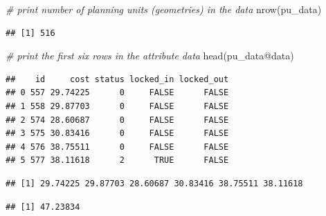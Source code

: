 \documentclass[
  12pt,
]{book}
\newenvironment{Shaded}{\begin{snugshade}}{\end{snugshade}}
\newcommand{\CommentTok}[1]{\textcolor[rgb]{0.56,0.35,0.01}{\textit{#1}}}
\newcommand{\FunctionTok}[1]{\textcolor[rgb]{0.00,0.00,0.00}{#1}}
\newcommand{\NormalTok}[1]{#1}
\newcommand{\SpecialCharTok}[1]{\textcolor[rgb]{0.00,0.00,0.00}{#1}}
\begin{document}
\begin{Shaded}
\begin{Highlighting}[]
\CommentTok{\# print number of planning units (geometries) in the data}
\FunctionTok{nrow}\NormalTok{(pu\_data)}
\end{Highlighting}
\end{Shaded}

\begin{verbatim}
## [1] 516
\end{verbatim}

\begin{Shaded}
\begin{Highlighting}[]
\CommentTok{\# print the first six rows in the attribute data}
\FunctionTok{head}\NormalTok{(pu\_data}\SpecialCharTok{@}\NormalTok{data)}
\end{Highlighting}
\end{Shaded}

\begin{verbatim}
##    id     cost status locked_in locked_out
## 0 557 29.74225      0     FALSE      FALSE
## 1 558 29.87703      0     FALSE      FALSE
## 2 574 28.60687      0     FALSE      FALSE
## 3 575 30.83416      0     FALSE      FALSE
## 4 576 38.75511      0     FALSE      FALSE
## 5 577 38.11618      2      TRUE      FALSE
\end{verbatim}

\begin{Shaded}
\end{Shaded}

\begin{verbatim}
## [1] 29.74225 29.87703 28.60687 30.83416 38.75511 38.11618
\end{verbatim}

\begin{Shaded}
\end{Shaded}

\begin{verbatim}
## [1] 47.23834
\end{verbatim}
\end{document}
